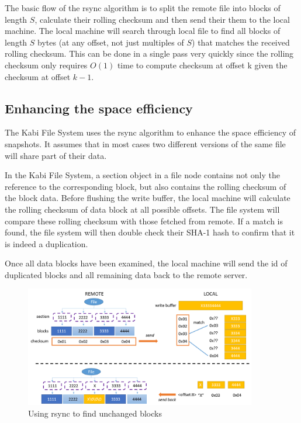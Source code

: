     The basic flow of the rsync algorithm is to split the remote file into blocks of length $S$, calculate their rolling checksum and then send their them to the local machine. The local machine will search through local file to find all blocks of length $S$ bytes (at any offset, not just multiples of $S$) that matches the received rolling checksum. This can be done in a single pass very quickly since the rolling checksum only requires $O(1)$ time to compute checksum at offset k given the checksum at offset $k-1$.

\subsection{Enhancing the space efficiency}

    The Kabi File System uses the rsync algorithm to enhance the space efficiency of snapshots. It assumes that in most cases two different versions of the same file will share part of their data.

    In the Kabi File System, a section object in a file node contains not only the reference to the corresponding block, but also contains the rolling checksum of the block data. Before flushing the write buffer, the local machine will calculate the rolling checksum of data block at all possible offsets. The file system will compare these rolling checksum with those fetched from remote. If a match is found, the file system will then double check their SHA-1 hash to confirm that it is indeed a duplication.
    
    Once all data blocks have been examined, the local machine will send the id of duplicated blocks and all remaining data back to the remote server.


\begin{figure}[hbtp]
\centering
\includegraphics[width=0.9\textwidth]{Chapter-4/figs/fig25.png}
\caption{Using rsync to find unchanged blocks}
\label{fig:rsync}
\end{figure}

